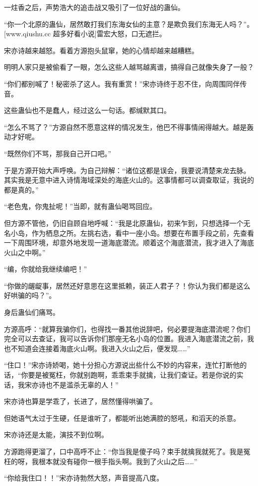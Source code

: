 \begin{this_body}
一炷香之后，声势浩大的追击战又吸引了一位好战的蛊仙。

“你一个北原的蛊仙，居然敢打我们东海女仙的主意？是欺负我们东海无人吗？”。[www.qiushu.cc 超多好看小说]雷宏大怒，口无遮拦。

宋亦诗越来越怒。看着方源抱头鼠窜，她的心情却越来越糟糕。

明明人家只是被偷看了一眼，怎么这些人越骂越离谱，搞得自己就像失身了一般？

“你们都别喊了！秘密杀了这人。我有重赏！”宋亦诗终于忍不住，向周围同伴传音。

这些蛊仙也不是蠢人，经过这么一句话。都缄默其口。

“怎么不骂了？”方源自然不愿意这样的情况发生，他巴不得事情闹得越大。越是轰动才好呢。

“既然你们不骂，那我自己开口吧。”

于是方源开始大声呼唤。为自己辩解：“诸位这都是误会，我要说清楚来龙去脉。其实我是无意中进入诗情海域深处的海底火山的。这事情都可以调查取证，我说的都是真的。”

“老色鬼，你鬼扯呢！”当即，就有蛊仙喝骂回应。

但方源不管他，仍旧自顾自地呼喊：“我是北原蛊仙，初来乍到，只想选择一个无名小岛，作为栖息之所。左挑右选，看中一座小岛。想要在布置手段之前，先查看一下周围环境，却意外地发现一道海底潜流。顺着这个海底潜流，我才进入了海底火山之中啊。”

“编，你就给我继续编吧！”

“你做的龌龊事，居然还好意思在这里抵赖，装正人君子？！你认为我们都是这么好哄骗的吗？”。

身后蛊仙们痛骂。

方源高呼：“就算我骗你们，也得找一番其他说辞吧，何必要提海底潜流呢？你们完全可以去查证，我可以告诉你们那座无名小岛的位置。我进入海底潜流之前，我也不知道会连接着海底火山啊。我进入火山之后，便发现……”

“住口！”宋亦诗娇喝，她十分担心方源说出些什么不妙的内容来，连忙打断他的话，“你要是被冤枉，你就别跑啊，乖乖束手就擒，让我们查证。若是你说的实话，我宋亦诗也不是滥杀无辜的人！”

宋亦诗也算是学乖了，长进了，居然懂得哄骗了。

但她语气太过于生硬，任是谁听了，都能听出她满腔的怒吼，和滔天的杀意。

宋亦诗还是太能，演技不到位啊。

方源跑得更溜了，口中高呼不止：“你当我是傻子吗？束手就擒我就死了。我是冤枉的呀，我根本就没有碰你一根手指头啊。我到了火山之后……”

“你给我住口！！”宋亦诗勃然大怒，声音提高八度。


\end{this_body}
